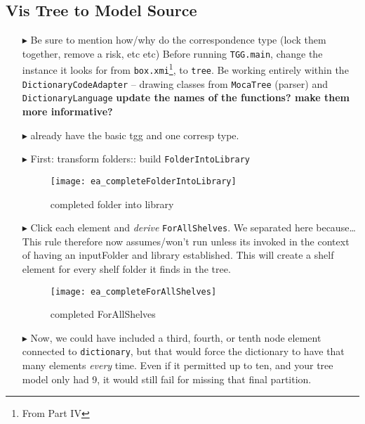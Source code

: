 \newpage
\hypertarget{treeToModel vis}{}
\subsection{Vis Tree to Model Source}
\visHeader

\begin{itemize}

\item[$\blacktriangleright$] Be sure to mention how/why do the correspondence type (lock them together, remove a risk, etc etc)
Before running \texttt{TGG.main}, change the instance it looks for from \texttt{box.xmi}\footnote{From Part IV}, to \texttt{tree}.
Be working entirely within the \texttt{DictionaryCodeAdapter} -- drawing classes from \texttt{MocaTree} (parser) and \texttt{DictionaryLanguage}
{\bf update the names of the functions? make them more informative?}


\item[$\blacktriangleright$] already have the basic tgg and one corresp type.

\item[$\blacktriangleright$] First: transform folders:: build \texttt{FolderIntoLibrary}

\begin{figure}[htbp]
\begin{center}
  \texttt{[image: ea\_completeFolderIntoLibrary]}
  \caption{completed folder into library}
  \label{ea:FolderIntoLibrary_Complete}
\end{center}
\end{figure}

\item[$\blacktriangleright$] Click each element and \emph{derive} \texttt{ForAllShelves}. We separated here because\ldots This rule therefore now assumes/won't
run unless its invoked in the context of having an inputFolder and library established. This will create a shelf element for every shelf folder it finds in the tree.

\begin{figure}[htbp]
\begin{center}
  \texttt{[image: ea\_completeForAllShelves]}
  \caption{completed ForAllShelves}
  \label{ea:ForAllShelves_Complete}
\end{center}
\end{figure}

\item[$\blacktriangleright$] Now, we could have included a third, fourth, or tenth node element connected to \texttt{dictionary}, but that would force the
dictionary to have that many elements \emph{every} time. Even if it permitted up to ten, and your tree model only had 9, it would still fail for missing that
final partition.


\end{itemize}
